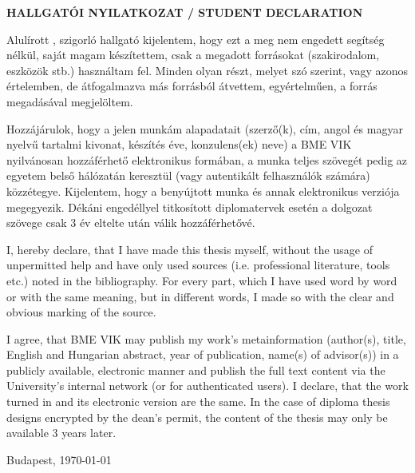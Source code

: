 \begin{center}
\large
\textbf{HALLGATÓI NYILATKOZAT / STUDENT DECLARATION}\\
\end{center}

Alulírott \emph{\vikszerzoVezeteknev{} \vikszerzoKeresztnev}, szigorló hallgató kijelentem, hogy ezt a \vikmunkatipusat{} meg nem engedett segítség nélkül, saját magam készítettem, csak a megadott forrásokat (szakirodalom, eszközök stb.) használtam fel. Minden olyan részt, melyet szó szerint, vagy azonos értelemben, de átfogalmazva más forrásból átvettem, egyértelműen, a forrás megadásával megjelöltem.

Hozzájárulok, hogy a jelen munkám alapadatait (szerző(k), cím, angol és magyar nyelvű tartalmi kivonat, készítés éve, konzulens(ek) neve) a BME VIK nyilvánosan hozzáférhető elektronikus formában, a munka teljes szövegét pedig az egyetem belső hálózatán keresztül (vagy autentikált felhasználók számára) közzétegye. Kijelentem, hogy a benyújtott munka és annak elektronikus verziója megegyezik. Dékáni engedéllyel titkosított diplomatervek esetén a dolgozat szövege csak 3 év eltelte után válik hozzáférhetővé.
\break

I, \emph{\vikszerzoKeresztnev{} \vikszerzoVezeteknev} hereby declare, that I have made this thesis myself, without the usage of unpermitted help and have only used sources (i.e. professional literature, tools etc.) noted in the bibliography. For every part, which I have used word by word or with the same meaning, but in different words, I made so with the clear and obvious marking of the source.

I agree, that BME VIK may publish my work's metainformation (author(s), title, English and Hungarian abstract, year of publication, name(s) of advisor(s)) in a publicly available, electronic manner and publish the full text content via the University's internal network (or for authenticated users). I declare, that the work turned in and its electronic version are the same. In the case of diploma thesis designs encrypted by the dean's permit, the content of the thesis may only be available 3 years later.

\begin{flushleft}
\vspace*{1cm}
Budapest, \today
\end{flushleft}

\begin{flushright}
 \vspace*{1cm}
 \makebox[7cm]{\rule{6cm}{.4pt}}\\
 \makebox[7cm]{\emph{\vikszerzoVezeteknev{} \vikszerzoKeresztnev}}\\
\end{flushright}
\thispagestyle{empty}

\vfill
\clearpage
\thispagestyle{empty} %

\selectthesislanguage
